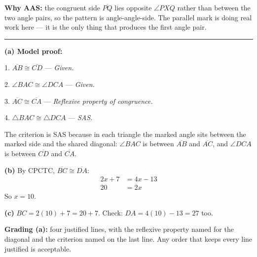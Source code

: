 \documentclass[12pt]{article}
\begin{document}
\textbf{Why AAS:} the congruent side $\overline{PQ}$ lies opposite $\angle PXQ$ rather than between the two angle pairs, so the pattern is angle-angle-side. The parallel mark is doing real work here --- it is the only thing that produces the first angle pair.

\vspace{0.2cm}\noindent\rule{\linewidth}{0.2pt}


\textbf{(a) Model proof:}

1. $\overline{AB} \cong \overline{CD}$ --- \emph{Given.}

2. $\angle BAC \cong \angle DCA$ --- \emph{Given.}

3. $\overline{AC} \cong \overline{CA}$ --- \emph{Reflexive property of congruence.}

4. $\triangle BAC \cong \triangle DCA$ --- \emph{SAS.}

The criterion is SAS because in each triangle the marked angle sits between the marked side and the shared diagonal: $\angle BAC$ is between $\overline{AB}$ and $\overline{AC}$, and $\angle DCA$ is between $\overline{CD}$ and $\overline{CA}$.

\textbf{(b)} By CPCTC, $\overline{BC} \cong \overline{DA}$:
\begin{align*}
  2x + 7 &= 4x - 13 \\
  20 &= 2x
\end{align*}
So $x = 10$. 

\textbf{(c)} $BC = 2(10) + 7 = 20 + 7$. Check: $DA = 4(10) - 13 = 27$ too. 

\textbf{Grading (a):} four justified lines, with the reflexive property named for the diagonal and the criterion named on the last line. Any order that keeps every line justified is acceptable.
\end{document}
